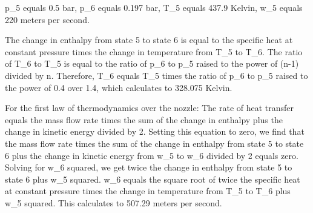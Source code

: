 p_5 equals 0.5 bar,
p_6 equals 0.197 bar,
T_5 equals 437.9 Kelvin,
w_5 equals 220 meters per second.

The change in enthalpy from state 5 to state 6 is equal to the specific heat at constant pressure times the change in temperature from T_5 to T_6.
The ratio of T_6 to T_5 is equal to the ratio of p_6 to p_5 raised to the power of (n-1) divided by n. Therefore, T_6 equals T_5 times the ratio of p_6 to p_5 raised to the power of 0.4 over 1.4, which calculates to 328.075 Kelvin.

For the first law of thermodynamics over the nozzle:
The rate of heat transfer equals the mass flow rate times the sum of the change in enthalpy plus the change in kinetic energy divided by 2.
Setting this equation to zero, we find that the mass flow rate times the sum of the change in enthalpy from state 5 to state 6 plus the change in kinetic energy from w_5 to w_6 divided by 2 equals zero.
Solving for w_6 squared, we get twice the change in enthalpy from state 5 to state 6 plus w_5 squared.
w_6 equals the square root of twice the specific heat at constant pressure times the change in temperature from T_5 to T_6 plus w_5 squared. This calculates to 507.29 meters per second.